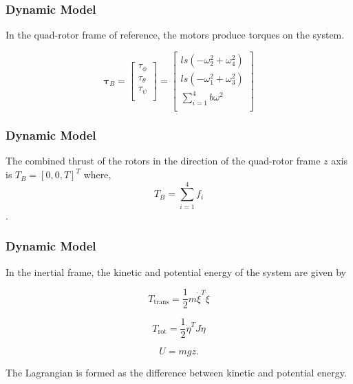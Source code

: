 \documentclass{beamer}
\begin{document}
\begin{frame}
\frametitle{Dynamic Model}


In the quad-rotor frame of reference, the motors produce torques on the system.

\begin{equation}
    \label{taub}
    \boldsymbol \tau_B = \left[ \begin{array}{c} \tau_{\phi}\\\tau_{\theta}\\\tau_{\psi}\\ \end{array} \right] = \left[ \begin{array}{c} l s (-\omega_2^2 + \omega_4^2)\\l s (-\omega_1^2 + \omega_3^2)\\ \displaystyle \sum \limits_{i=1}^4 b \omega^2\\\end{array} \right]
\end{equation}

\end{frame}




\begin{frame}
\frametitle{Dynamic Model}


The combined thrust of the rotors in the direction of the quad-rotor frame $z$ axis is $T_B = [0, 0, T]^T$ where,\\

\begin{equation}
    \label{totalThrust}
    T_B =  \displaystyle \sum \limits_{i=1}^4 f_i
\end{equation}.

\end{frame}



\begin{frame}
\frametitle{Dynamic Model}

In the inertial frame, the kinetic and potential energy of the system are given by

\begin{equation}
    T_{\text{trans}}=\frac{1}{2}m\dot{\xi }^T\dot{\xi }
\end{equation}


\begin{equation}
    T_{\text{rot}}= \frac{1}{2}\dot{\eta }^T J \dot{\eta }
\end{equation}


\begin{equation}
    U = m g z.
\end{equation}

The Lagrangian is formed as the difference between kinetic and potential energy.
\end{frame}
\end{document}
